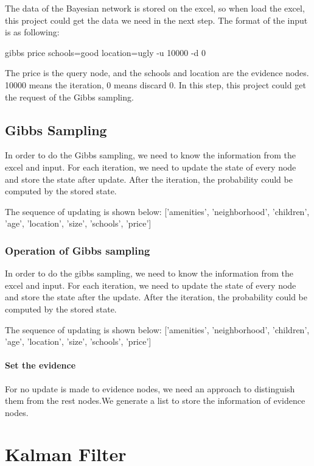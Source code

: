 \documentclass[11pt, a4paper]{article}
\begin{document}
The data of the Bayesian network is stored on the excel, so when load the excel, this project could get the data we need in the next step. The format of the input is as following:

gibbs price schools=good location=ugly -u 10000 -d 0

The price is the query node, and the schools and location are the evidence nodes. 10000 means the iteration, 0 means discard 0.
In this step, this project could get the request of the Gibbs sampling.

\subsection{Gibbs Sampling}

In order to do the Gibbs sampling, we need to know the information from the excel and input. For each iteration, we need to update the state of every node and store the state after update. After the iteration, the probability could be computed by the stored state.


The sequence of updating is shown below:
['amenities', 'neighborhood', 'children', 'age', 'location', 'size', 'schools', 'price']

\subsubsection{Operation of Gibbs sampling}

In order to do the gibbs sampling, we need to know the information from the excel and input. For each iteration, we need to update the state of every node and store the state after the update. After the iteration, the probability could be computed by the stored state.


The sequence of updating is shown below:
['amenities', 'neighborhood', 'children', 'age', 'location', 'size', 'schools', 'price']

\paragraph{Set the evidence}

For no update is made to evidence nodes, we need an approach to distinguish them from the rest nodes.We generate a list to store the information of evidence nodes. 


\section{Kalman Filter}
\end{document}
